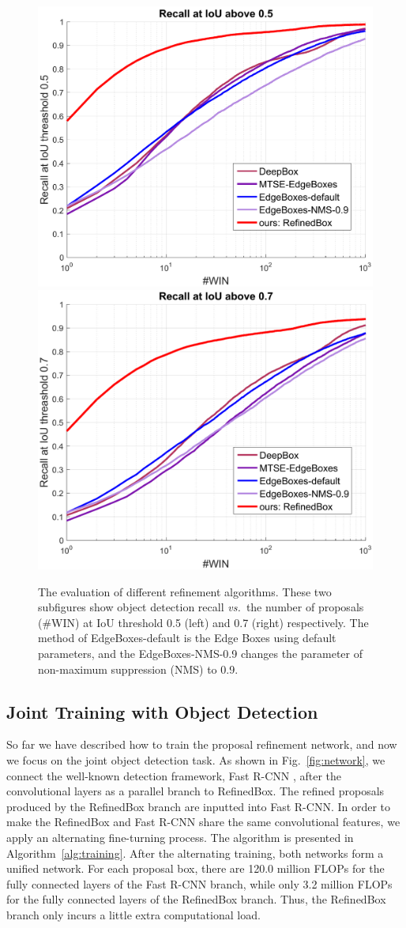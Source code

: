 \documentclass[letterpaper]{article} %
\newcommand{\figref}[1]{Fig.~\ref{#1}}
\newcommand{\algref}[1]{Algorithm~\ref{#1}}
\def\vs{\emph{vs.~}}
\begin{document}
\begin{figure}[!ht]
  \centering
  \includegraphics[width=.425\linewidth]{refine-recall-proposals-0_5} \hspace{.03\linewidth}
  \includegraphics[width=.425\linewidth]{refine-recall-proposals-0_7} \\
  \caption{The evaluation of different refinement algorithms. These two subfigures
  	show object detection recall \vs the number of proposals (\#WIN) at IoU threshold
    0.5 (left) and 0.7 (right) respectively. The method of EdgeBoxes-default is
    the Edge Boxes \cite{zitnick2014edge} using default parameters, and the
    EdgeBoxes-NMS-0.9 changes the parameter of non-maximum suppression (NMS)
    to 0.9.}
  \label{fig:refine-evaluation}
\end{figure}


\subsection{Joint Training with Object Detection} \label{sec: detection}
%
So far we have described how to train the proposal refinement network,
and now we focus on the joint object detection task.
%
As shown in \figref{fig:network}, we connect the well-known detection framework,
Fast R-CNN \cite{girshick2015fast}, after the convolutional layers as a parallel
branch to RefinedBox.
The refined proposals produced by the RefinedBox branch are inputted into Fast R-CNN.
%
In order to make the RefinedBox and Fast R-CNN share the same convolutional features,
we apply an alternating fine-turning process.
The algorithm is presented in \algref{alg:training}.
After the alternating training, both networks form a unified network.
%
For each proposal box, there are 120.0 million FLOPs for the fully connected layers
of the Fast R-CNN branch, while only 3.2 million FLOPs for the fully connected layers
of the RefinedBox branch.
Thus, the RefinedBox branch only incurs a little extra computational load.
\end{document}

